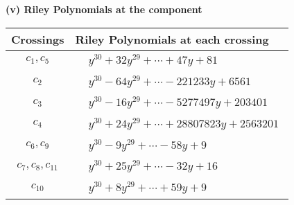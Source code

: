 \documentclass[1p]{elsarticle_modified}
\theoremstyle{definition}
\begin{document}
\flushleft \textbf{(v) Riley Polynomials at the component}\newline \\
\begin{tabular}{m{50pt}|m{274pt}}
Crossings & \hspace{64pt}Riley Polynomials at each crossing \\
\hline $$\begin{aligned}c_{1},c_{5}\end{aligned}$$&$\begin{aligned}
&y^{30}+32 y^{29}+\cdots+47 y+81
\end{aligned}$\\
\hline $$\begin{aligned}c_{2}\end{aligned}$$&$\begin{aligned}
&y^{30}-64 y^{29}+\cdots-221233 y+6561
\end{aligned}$\\
\hline $$\begin{aligned}c_{3}\end{aligned}$$&$\begin{aligned}
&y^{30}-16 y^{29}+\cdots-5277497 y+203401
\end{aligned}$\\
\hline $$\begin{aligned}c_{4}\end{aligned}$$&$\begin{aligned}
&y^{30}+24 y^{29}+\cdots+28807823 y+2563201
\end{aligned}$\\
\hline $$\begin{aligned}c_{6},c_{9}\end{aligned}$$&$\begin{aligned}
&y^{30}-9 y^{29}+\cdots-58 y+9
\end{aligned}$\\
\hline $$\begin{aligned}c_{7},c_{8},c_{11}\end{aligned}$$&$\begin{aligned}
&y^{30}+25 y^{29}+\cdots-32 y+16
\end{aligned}$\\
\hline $$\begin{aligned}c_{10}\end{aligned}$$&$\begin{aligned}
&y^{30}+8 y^{29}+\cdots+59 y+9
\end{aligned}$\\
\hline
\end{tabular}\\~\\
\end{document}
